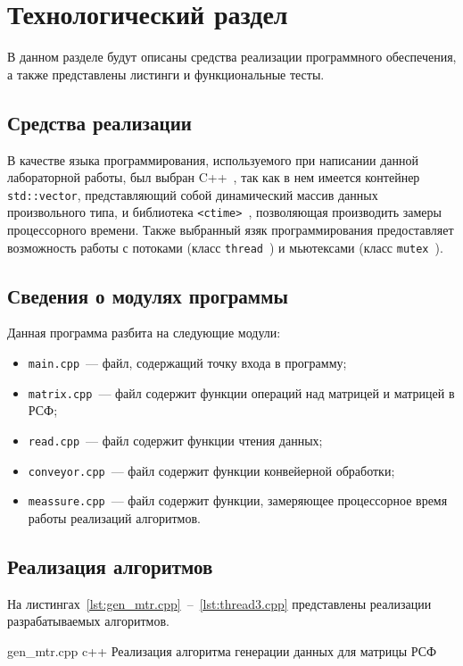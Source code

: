 \chapter{Технологический раздел}
В данном разделе будут описаны средства реализации программного обеспечения, а также представлены листинги и функциональные тесты.

\section{Средства реализации}
В качестве языка программирования, используемого при написании данной лабораторной работы, был выбран C++~\cite{cpp-lang}, так как в нем имеется контейнер \texttt{std::vector}, представляющий собой динамический массив данных произвольного типа, и библиотека \texttt{<ctime>}~\cite{cpp-ctime}, позволяющая производить замеры процессорного времени.
Также выбранный язяк программирования предоставляет возможность работы с потоками (класс \texttt{thread}~\cite{cpp-thread}) и мьютексами (класс \texttt{mutex}~\cite{cpp-mutex}).

\section{Сведения о модулях программы}
Данная программа разбита на следующие модули:
\begin{itemize}
	\item \texttt{main.cpp}~--- файл, содержащий точку входа в программу;
	\item \texttt{matrix.cpp}~--- файл содержит функции операций над матрицей и матрицей в РСФ;
	\item \texttt{read.cpp}~--- файл содержит функции чтения данных;
	\item \texttt{conveyor.cpp}~--- файл содержит функции конвейерной обработки;
	\item \texttt{meassure.cpp}~--- файл содержит функции, замеряющее процессорное время работы реализаций алгоритмов.
\end{itemize}
	
\section{Реализация алгоритмов}
На листингах~\ref{lst:gen_mtr.cpp}~--~\ref{lst:thread3.cpp} представлены реализации разрабатываемых алгоритмов.

\newpage 

{gen_mtr.cpp}
{c++}
{Реализация алгоритма генерации данных для матрицы РСФ}

